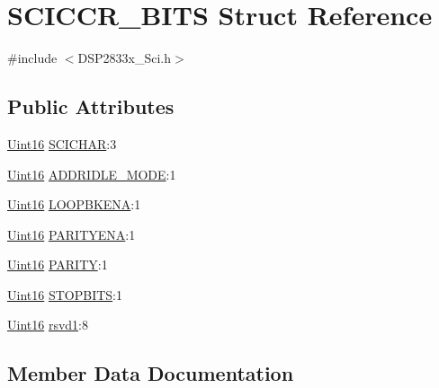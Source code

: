 \hypertarget{struct_s_c_i_c_c_r___b_i_t_s}{}\section{S\+C\+I\+C\+C\+R\+\_\+\+B\+I\+T\+S Struct Reference}
\label{struct_s_c_i_c_c_r___b_i_t_s}


{\ttfamily \#include $<$D\+S\+P2833x\+\_\+\+Sci.\+h$>$}

\subsection*{Public Attributes}
\begin{DoxyCompactItemize}
\item 
\hyperlink{_d_s_p2833x___device_8h_a59a9f6be4562c327cbfb4f7e8e18f08b}{Uint16} \hyperlink{struct_s_c_i_c_c_r___b_i_t_s_a5905dc933eca9a6642fec892cd535c13}{S\+C\+I\+C\+H\+A\+R}\+:3
\item 
\hyperlink{_d_s_p2833x___device_8h_a59a9f6be4562c327cbfb4f7e8e18f08b}{Uint16} \hyperlink{struct_s_c_i_c_c_r___b_i_t_s_a1ee5537d604142dc799fdb16024e4df2}{A\+D\+D\+R\+I\+D\+L\+E\+\_\+\+M\+O\+D\+E}\+:1
\item 
\hyperlink{_d_s_p2833x___device_8h_a59a9f6be4562c327cbfb4f7e8e18f08b}{Uint16} \hyperlink{struct_s_c_i_c_c_r___b_i_t_s_a5b688e83f694986da71fc070f6368791}{L\+O\+O\+P\+B\+K\+E\+N\+A}\+:1
\item 
\hyperlink{_d_s_p2833x___device_8h_a59a9f6be4562c327cbfb4f7e8e18f08b}{Uint16} \hyperlink{struct_s_c_i_c_c_r___b_i_t_s_ad4fc726d0f0ddc99e917ffe95a14b356}{P\+A\+R\+I\+T\+Y\+E\+N\+A}\+:1
\item 
\hyperlink{_d_s_p2833x___device_8h_a59a9f6be4562c327cbfb4f7e8e18f08b}{Uint16} \hyperlink{struct_s_c_i_c_c_r___b_i_t_s_a502877d03d795735c57f390aa7c94ebe}{P\+A\+R\+I\+T\+Y}\+:1
\item 
\hyperlink{_d_s_p2833x___device_8h_a59a9f6be4562c327cbfb4f7e8e18f08b}{Uint16} \hyperlink{struct_s_c_i_c_c_r___b_i_t_s_ac25e8cbd01da3fd64d1c2848c6706020}{S\+T\+O\+P\+B\+I\+T\+S}\+:1
\item 
\hyperlink{_d_s_p2833x___device_8h_a59a9f6be4562c327cbfb4f7e8e18f08b}{Uint16} \hyperlink{struct_s_c_i_c_c_r___b_i_t_s_a275dcf6ed62e2493422fea302f0346c4}{rsvd1}\+:8
\end{DoxyCompactItemize}


\subsection{Member Data Documentation}
\hypertarget{struct_s_c_i_c_c_r___b_i_t_s_a1ee5537d604142dc799fdb16024e4df2}{}
